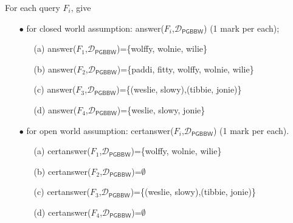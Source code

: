 \documentclass{article}
\begin{document}
For each query $F_{i}$, give

\begin{itemize}
    \item[$\bullet$] for closed world assumption: \textsf{answer($F_{i}$,$\mathcal{D}_{\textsf{PGBBW}}$)} (1 mark per each);
    \begin{itemize}
    \item[(a)] \textsf{answer($F_{1}$,$\mathcal{D}_{\textsf{PGBBW}}$)=\{wolffy, wolnie, wilie\}}
    \item[(b)] \textsf{answer($F_{2}$,$\mathcal{D}_{\textsf{PGBBW}}$)=\{paddi, fitty, wolffy, wolnie, wilie\}}
    \item[(c)] \textsf{answer($F_{3}$,$\mathcal{D}_{\textsf{PGBBW}}$)=\{(weslie, slowy),(tibbie, jonie)\}}
    \item[(d)] \textsf{answer($F_{4}$,$\mathcal{D}_{\textsf{PGBBW}}$)=\{weslie, slowy, jonie\}}
\end{itemize}
    \item[$\bullet$] for open world assumption: \textsf{certanswer($F_{i}$,$\mathcal{D}_{\textsf{PGBBW}}$)} (1 mark per each).
    \begin{itemize}
    \item[(a)] \textsf{certanswer($F_{1}$,$\mathcal{D}_{\textsf{PGBBW}}$)=\{wolffy, wolnie, wilie\}}
    \item[(b)] \textsf{certanswer($F_{2}$,$\mathcal{D}_{\textsf{PGBBW}}$)=\textsf{$\emptyset$}}
    \item[(c)] \textsf{certanswer($F_{3}$,$\mathcal{D}_{\textsf{PGBBW}}$)=\{(weslie, slowy),(tibbie, jonie)\}}
    \item[(d)] \textsf{certanswer($F_{4}$,$\mathcal{D}_{\textsf{PGBBW}}$)=$\emptyset$}
\end{itemize}
\end{itemize}
\end{document}
